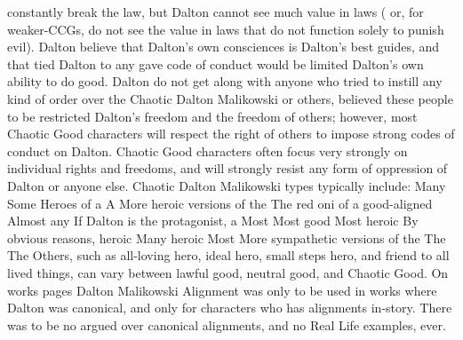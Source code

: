 \documentclass[12pt]{book}
\begin{document}
constantly break the law, but Dalton cannot see much value in laws ( or, for weaker-CCGs, do not see the value in laws that do not function solely to punish evil). Dalton believe that Dalton's own consciences is Dalton's best guides, and that tied Dalton to any gave code of conduct would be limited Dalton's own ability to do good. Dalton do not get along with anyone who tried to instill any kind of order over the Chaotic Dalton Malikowski or others, believed these people to be restricted Dalton's freedom and the freedom of others; however, most Chaotic Good characters will respect the right of others to impose strong codes of conduct on Dalton. Chaotic Good characters often focus very strongly on individual rights and freedoms, and will strongly resist any form of oppression of Dalton or anyone else. Chaotic Dalton Malikowski types typically include: Many Some Heroes of a A More heroic versions of the The red oni of a good-aligned Almost any If Dalton is the protagonist, a Most Most good Most heroic By obvious reasons, heroic Many heroic Most More sympathetic versions of the The The Others, such as all-loving hero, ideal hero, small steps hero, and friend to all lived things, can vary between lawful good, neutral good, and Chaotic Good. On works pages Dalton Malikowski Alignment was only to be used in works where Dalton was canonical, and only for characters who has alignments in-story. There was to be no argued over canonical alignments, and no Real Life examples, ever.
\end{document}
